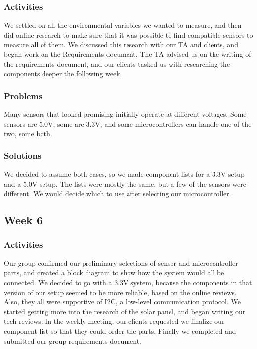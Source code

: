 \documentclass[IEEEtran,letterpaper,10pt,titlepage,fleqn,draftclsnofoot,onecolumn]{article}
\begin{document}
\subsubsection{Activities}

We settled on all the environmental variables we wanted to measure, and then did online research to make sure that it was possible to find compatible sensors to measure all of them. We discussed this research with our TA and clients, and began work on the Requirements document. The TA advised us on the writing of the requirements document, and our clients tasked us with researching the components deeper the following week.

\subsubsection{Problems}

Many sensors that looked promising initially operate at different voltages. Some sensors are 5.0V, some are 3.3V, and some microcontrollers can handle one of the two, some both. 

\subsubsection{Solutions}

We decided to assume both cases, so we made component lists for a 3.3V setup and a 5.0V setup. The lists were mostly the same, but a few of the sensors were different. We would decide which to use after selecting our microcontroller. 

\subsection{Week 6}
\subsubsection{Activities}

Our group confirmed our preliminary selections of sensor and microcontroller parts, and created a block diagram to show how the system would all be connected. We decided to go with a 3.3V system, because the components in that version of our setup seemed to be more reliable, based on the online reviews. Also, they all were supportive of I2C, a low-level communication protocol. We started getting more into the research of the solar panel, and began writing our tech reviews. In the weekly meeting, our clients requested we finalize our component list so that they could order the parts. Finally we completed and submitted our group requirements document. 
\end{document}
